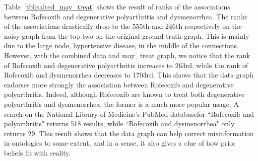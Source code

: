 Table~\ref{tbl:salted_may_treat} shows the result of ranks of the associations between Rofecoxib and degenerative polyarthritis and dysmenorrhea. The ranks of the associations drastically drop to the 555th and 246th respectively on the noisy graph from the top two on the original ground truth graph. This is mainly due to the large node, hypertensive disease, in the middle of the connections. However, with the combined data and may\_treat graph, we notice that the rank of Rofecoxib and degenerative polyarthritis increases to 263rd, while the rank of Rofecoxib and  dysmenorrhea decreases to 1703rd. This shows that the data graph endorses more strongly the association between Rofecoxib and degenerative polyarthritis. Indeed, although Rofecoxib are known to treat both degenerative polyarthritis and dysmenorrhea, the former is a much more popular usage. A search on the National Library of Medicine's PubMed database\footnotemark[1] for ``Rofecoxib and polyarthritis" returns 518 results, while ``Rofecoxib and dysmenorrhea" only returns 29. This result shows that the data graph can help correct misinformation in ontologies to some extent, and in a sense, it also gives a clue of how prior beliefs fit with reality.



